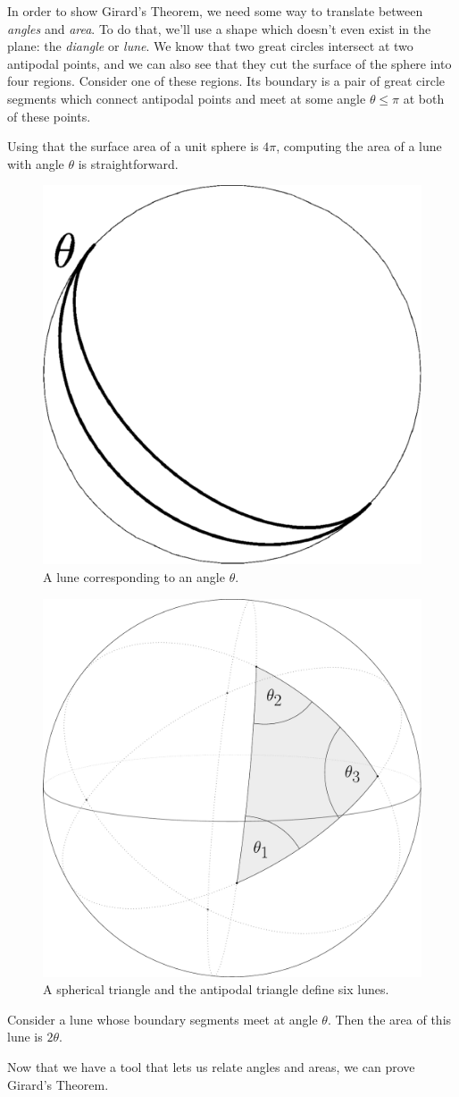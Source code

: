 In order to  show Girard's Theorem, we need some way to translate between \textit{angles} and \textit{area}.  To do that, we'll use a shape which doesn't even exist in the plane: the \textit{diangle} or \textit{lune}.    We know that two great circles intersect at two antipodal points, and we can also see that they cut the surface of the sphere into four regions.  Consider one of these regions.  Its boundary is a pair of great circle segments which connect antipodal points and meet at some angle $\theta\leq \pi$ at both of these points.   

Using that the surface area of a unit sphere is $4\pi$, computing the area of a lune with angle $\theta$ is straightforward.


\begin{figure}[htb]
	\centering
	\includegraphics[width=.35\textwidth]{figs/lune.pdf}
	\caption{A lune corresponding to an angle $\theta$. }
	\label{fig:lune}
\end{figure}
		\begin{figure}[htb]
	\centering
	\includegraphics[width=.35\textwidth]{figs/trilune.pdf}
	\caption{A spherical triangle and the antipodal triangle define six lunes.}
	\label{fig:trilune}
\end{figure}

\begin{claim}
	Consider a lune whose boundary segments meet at angle $\theta$.  Then the area of this lune is $2\theta$.
\end{claim}

Now that we have a tool that lets us relate angles and areas, we can prove Girard's Theorem.










